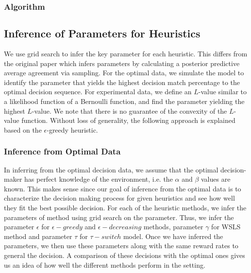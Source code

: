 \subsubsection{Algorithm}



\subsection{Inference of Parameters for Heuristics}
We use grid search to infer the key parameter for each heuristic. This differs from the original paper which infers parameters by calculating a posterior predictive average agreement via sampling. For the optimal data, we simulate the model to identify the parameter that yields the highest decision match percentage to the optimal decision sequence. For experimental data, we define an $L$-value similar to a likelihood function of a Bernoulli function, and find the parameter yielding the highest $L$-value. We note that there is no guarantee of the convexity of the $L$-value function. Without loss of generality, the following approach is explained based on the $\epsilon$-greedy heuristic. 

\subsubsection{Inference from Optimal Data}
In inferring from the optimal decision data, we assume that the optimal decision-maker has perfect knowledge of the environment, i.e. the $\alpha$ and $\beta$ values are known. This makes sense since our goal of inference from the optimal data is to characterize the decision making process for given heuristics and see how well they fit the best possible decision. For each of the heuristic methods, we infer the parameters of method using grid search on the parameter. Thus, we infer the parameter $\epsilon$ for $\epsilon-greedy$ and $\epsilon-decreasing$ methods, parameter $\gamma$ for WSLS method and parameter $\tau$ for $\tau-switch$ model. Once we have inferred the parameters, we then use these parameters along with the same reward rates to general the decision. A comparison of these decisions with the optimal ones gives us an idea of how well the different methods perform in the setting. 

